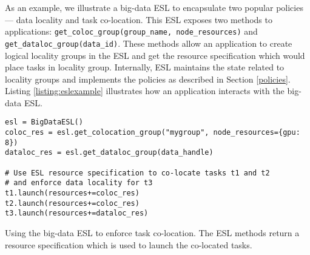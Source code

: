 \begin{sloppypar}
As an example, we illustrate a big-data ESL to encapsulate two popular policies --- data locality and task co-location. This ESL exposes two methods to applications: \lstinline[breaklines=true]{get_coloc_group(group_name, node_resources)} and \lstinline[breaklines=true]{get_dataloc_group(data_id)}. 
These methods allow an application to create logical locality groups in the ESL and get the resource specification which would place tasks in locality group. Internally, ESL maintains the state related to locality groups and implements the policies as described in Section \ref{policies}. Listing \ref{listing:eslexample} illustrates how an application interacts with the big-data ESL.
\end{sloppypar}

\begin{listing}
\begin{verbatim}
esl = BigDataESL()
coloc_res = esl.get_colocation_group("mygroup", node_resources={gpu: 8})
dataloc_res = esl.get_dataloc_group(data_handle)

# Use ESL resource specification to co-locate tasks t1 and t2
# and enforce data locality for t3
t1.launch(resources+=coloc_res)
t2.launch(resources+=coloc_res)
t3.launch(resources+=dataloc_res)
\end{verbatim}
\caption{\small Using the big-data ESL to enforce task co-location. The ESL methods return a resource specification which is used to launch the co-located tasks.}
\label{listing:eslexample}
\end{listing}


